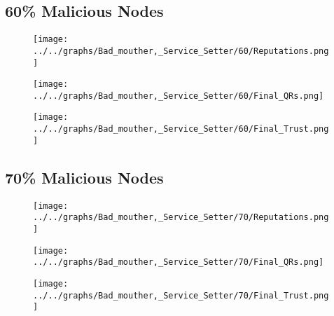 \begin{minipage}[t]{0.49\columnwidth}
\subsection*{60\% Malicious Nodes}
    \begin{figure}[H]
        \centering
        \texttt{[image: ../../graphs/Bad\_mouther,\_Service\_Setter/60/Reputations.png]}
    \end{figure}
    \begin{figure}[H]
        \centering
        \texttt{[image: ../../graphs/Bad\_mouther,\_Service\_Setter/60/Final\_QRs.png]}
    \end{figure}
\end{minipage}
\begin{minipage}[t]{0.49\columnwidth}
    \begin{figure}[H]
        \centering
        \texttt{[image: ../../graphs/Bad\_mouther,\_Service\_Setter/60/Final\_Trust.png]}
    \end{figure}
\end{minipage}

\begin{minipage}[t]{0.49\columnwidth}
\subsection*{70\% Malicious Nodes}
    \begin{figure}[H]
        \centering
        \texttt{[image: ../../graphs/Bad\_mouther,\_Service\_Setter/70/Reputations.png]}
    \end{figure}
    \begin{figure}[H]
        \centering
        \texttt{[image: ../../graphs/Bad\_mouther,\_Service\_Setter/70/Final\_QRs.png]}
    \end{figure}
\end{minipage}
\begin{minipage}[t]{0.49\columnwidth}
    \begin{figure}[H]
        \centering
        \texttt{[image: ../../graphs/Bad\_mouther,\_Service\_Setter/70/Final\_Trust.png]}
    \end{figure}
\end{minipage}

